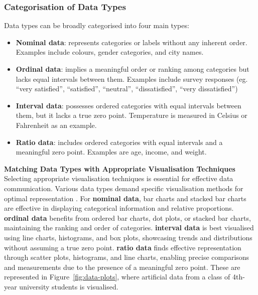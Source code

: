 \documentclass{article}\usepackage[]{graphicx}\usepackage[]{xcolor}
\numberwithin{equation}{section}
\begin{document}
\subsubsection{Categorisation of Data Types}
Data types can be broadly categorised into four main types: 
\begin{itemize}
    \item \textbf{Nominal data}: represents categories or labels without any inherent order. Examples include colours, gender categories, and city names. 
    \item \textbf{Ordinal data}: implies a meaningful order or ranking among categories but lacks equal intervals between them. Examples include survey responses (eg. “very satisfied”, “satisfied”, “neutral”, “dissatisfied”, “very dissatisfied”)
    \item \textbf{Interval data}: possesses ordered categories with equal intervals between them, but it lacks a true zero point. Temperature is measured in Celsius or Fahrenheit as an example. 
    \item \textbf{Ratio data}: includes ordered categories with equal intervals and a meaningful zero point. Examples are age, income, and weight. 
\end{itemize}

\noindent \textbf{Matching Data Types with Appropriate Visualisation Techniques}\\
\noindent Selecting appropriate visualisation techniques is essential for effective data communication. Various data types demand specific visualisation methods for optimal representation \cite{healy2018data}. For \textbf{nominal data}, bar charts and stacked bar charts are effective in displaying categorical information and relative proportions. \textbf{ordinal data} benefits from ordered bar charts, dot plots, or stacked bar charts, maintaining the ranking and order of categories. \textbf{interval data} is best visualised using line charts, histograms, and box plots, showcasing trends and distributions without assuming a true zero point. \textbf{ratio data} finds effective representation through scatter plots, histograms, and line charts, enabling precise comparisons and measurements due to the presence of a meaningful zero point. These are represented in Figure~\ref{fig:data-plots}, where artificial data from a class of 4th-year university students is visualised.
\end{document}
